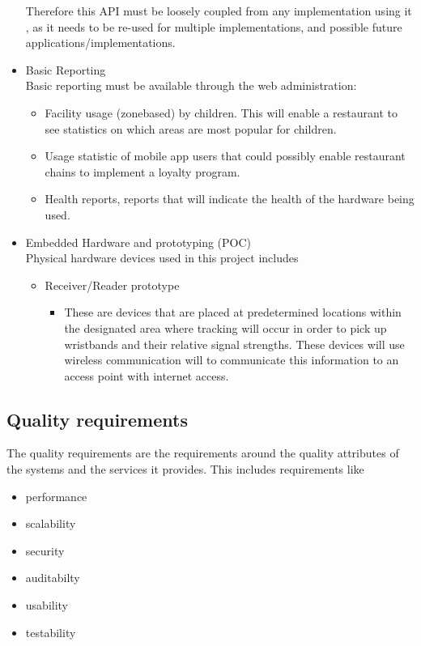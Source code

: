 \documentclass[11pt,titlepage]{article} %
\begin{document}
\begin{itemize}
Therefore this API must be loosely coupled from any implementation using it ,  as it needs to 
be re-used for multiple implementations, and possible future applications/implementations.
	\item{Basic Reporting}\\
		Basic reporting must be available through the web administration:
	\begin{itemize}
 \item  Facility usage (zonebased) by children. This will enable a restaurant to see statistics 
 on which areas are most popular for children. 
 \item  Usage statistic of mobile app users that could possibly enable restaurant chains to 
 implement a loyalty program. 
 \item  Health reports, reports that will indicate the health of the hardware being used. 
	\end{itemize}
	\item{Embedded Hardware and prototyping (POC)}\\
	Physical hardware devices used in this project includes
	\begin{itemize}
		 \item Receiver/Reader prototype
		 \begin{itemize}
		 \item These are devices that are placed  at predetermined  locations within the designated area where tracking will occur in order to pick up wristbands and  their relative signal strengths. These devices will use wireless communication 
 will to communicate this information to an access point with internet access. 
		 \end{itemize}
		 
		\end{itemize}
	\end{itemize}

\subsection{Quality requirements}
The quality requirements are the requirements around the quality attributes of the systems and the services it provides. 
This includes requirements like
\begin{itemize}
\item performance
\item scalability
\item security
\item auditabilty
\item usability
\item testability
\end{itemize}
\end{document}
